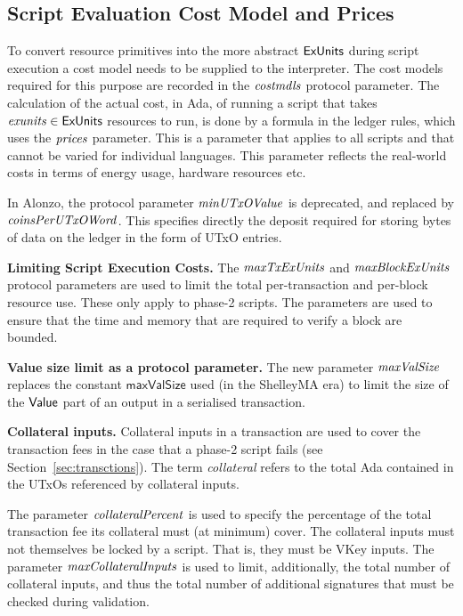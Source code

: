\subsection{Script Evaluation Cost Model and Prices}
\label{sec:cost-mod}

To convert resource primitives into the
more abstract $\mathsf{ExUnits}$ during script execution a cost model needs to be supplied to the interpreter.
The cost models required for this purpose are recorded in the $\mathit{costmdls}$ protocol parameter.
%
The calculation of the actual cost, in Ada, of running
a script that takes $\mathit{exunits} \in \mathsf{ExUnits}$ resources to run,
is done by a formula in the ledger rules, which uses the
$\mathit{prices}$ parameter. This is a parameter that applies to all
scripts and that cannot be varied for individual languages. This parameter
reflects the real-world costs in terms of energy usage, hardware resources etc.

In Alonzo, the protocol parameter $\mathit{minUTxOValue}$ is deprecated, and replaced by
$\mathit{coinsPerUTxOWord}$. This specifies directly the deposit required for storing
bytes of data on the ledger in the form of UTxO entries.

\textbf{Limiting Script Execution Costs.}
The $\mathit{maxTxExUnits}$ and $\mathit{maxBlockExUnits}$ protocol parameters are
used to limit the total per-transaction and per-block resource use. These only apply to phase-2 scripts.
The parameters are used to ensure that the time and memory that are required to verify a block are bounded.

\textbf{Value size limit as a protocol parameter.}
The new parameter $\mathit{maxValSize}$ replaces the constant $\mathsf{maxValSize}$
used (in the ShelleyMA era) to limit the size of the $\mathsf{Value}$ part of an output in a
serialised transaction.

\textbf{Collateral inputs.}
Collateral inputs in a transaction are used to cover the transaction fees in the case
that a phase-2 script fails (see Section~\ref{sec:transctions}).
The term \emph{collateral} refers to the total Ada contained in the UTxOs referenced
by collateral inputs.

The parameter $\mathit{collateralPercent}$ is used to specify the percentage of
the total transaction fee its collateral must (at minimum) cover. The
collateral inputs must not themselves be locked by a script. That is, they must
be VKey inputs. The parameter $\mathit{maxCollateralInputs}$ is used to limit, additionally,
the total number of collateral inputs, and thus the total number of additional
signatures that must be checked during validation.

